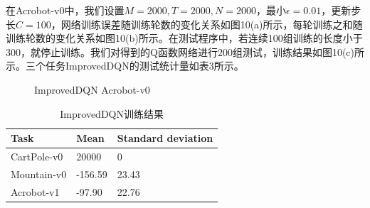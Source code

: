 \documentclass[a4paper,UTF8]{article}
\theoremstyle{definition}
\begin{document}
	在Acrobot-v0中，我们设置$M=2000,T=2000,N=2000$，最小$\epsilon=0.01$，更新步长$C=100$，网络训练误差随训练轮数的变化关系如图10(a)所示，每轮训练之和随训练轮数的变化关系如图10(b)所示。在测试程序中，若连续100组训练的长度小于300，就停止训练。我们对得到的Q函数网络进行200组测试，训练结果如图10(c)所示。三个任务ImprovedDQN的测试统计量如表3所示。


\begin{figure}[!h]
	\centering
	\caption{ImprovedDQN Acrobot-v0}

\end{figure}


\begin{table}[!h]
\caption{ImprovedDQN训练结果}  
\centering
\begin{tabular*}{8cm}{lll}  
\hline  
Task & Mean 
 &  Standard deviation\\  
\hline  
CartPole-v0  & 20000 & 0 \\  
Mountain-v0  & -156.59 & 23.43 \\ 
Acrobot-v1 	 & -97.90  & 22.76 \\ 
\hline  
\end{tabular*}  
\end{table} 
\end{document}
